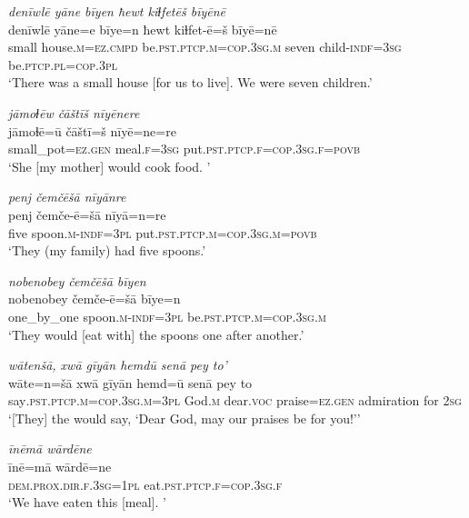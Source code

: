 \ea \label{ŽE.44}
\textit{denīwlē yāne bīyen ħewt kiɫfetēš bīyēnē} \\ 
\gll denīwlē yāne=e bīye=n ħewt kiɫfet-ē=š bīyē=nē \\ 
 small house\textsc{.m}\textsc{=ez}\textsc{.cmpd} be\textsc{.pst}\textsc{.ptcp}\textsc{.m}\textsc{=cop}\textsc{.3sg}\textsc{.m} seven child\textsc{-indf}\textsc{=3sg} be\textsc{.ptcp}\textsc{.pl}\textsc{=cop}\textsc{.3pl} \\ 
\glt `There was a small house [for us to live]. We were seven children.'
\z 
 
\ea \label{ŽE.45}
\textit{jāmoɫēw čāštīš nīyēnere} \\ 
\gll jāmoɫē=ū čāštī=š nīyē=ne=re \\ 
 small\_pot\textsc{\textsc{=ez.gen}} meal\textsc{.f}\textsc{=3sg} put\textsc{.pst}\textsc{.ptcp}\textsc{.f}\textsc{=cop}\textsc{.3sg}\textsc{.f}\textsc{=\textsc{povb}} \\ 
\glt `She [my mother] would cook food. '
\z 
 
\ea \label{ŽE.46}
\textit{penj čemčēšā nīyānre} \\ 
\gll penj čemče-ē=šā nīyā=n=re \\ 
 five spoon\textsc{.m}\textsc{-indf}\textsc{=3pl} put\textsc{.pst}\textsc{.ptcp}\textsc{.m}\textsc{=cop}\textsc{.3sg}\textsc{.m}\textsc{=\textsc{povb}} \\ 
\glt `They (my family) had five spoons.'
\z 
 
\ea \label{ŽE.47}
\textit{nobenobey čemčēšā bīyen} \\ 
\gll nobenobey čemče-ē=šā bīye=n \\ 
 one\_by\_one spoon\textsc{.m}\textsc{-indf}\textsc{=3pl} be\textsc{.pst}\textsc{.ptcp}\textsc{.m}\textsc{=cop}\textsc{.3sg}\textsc{.m} \\ 
\glt `They would [eat with] the spoons one after another.'
\z 
 
\ea \label{ŽE.49}
\textit{wātenšā, xwā gīyān hemdū senā pey to’} \\ 
\gll wāte=n=šā xwā gīyān hemd=ū senā pey to \\ 
 say\textsc{.pst}\textsc{.ptcp}\textsc{.m}\textsc{=cop}\textsc{.3sg}\textsc{.m}\textsc{=3pl} God\textsc{.m} dear.\textsc{voc} praise\textsc{\textsc{=ez.gen}} admiration for \textsc{2sg} \\ 
\glt `[They] the would say, ‘Dear God, may our praises be for you!’'
\z 
 
\ea \label{ŽE.53}
\textit{īnēmā wārdēne} \\ 
\gll īnē=mā wārdē=ne \\ 
 \textsc{dem.prox}\textsc{.dir}\textsc{.f}\textsc{.3sg}\textsc{=1pl} eat\textsc{.pst}\textsc{.ptcp}\textsc{.f}\textsc{=cop}\textsc{.3sg}\textsc{.f} \\ 
\glt `We have eaten this [meal]. '
\z 
 
